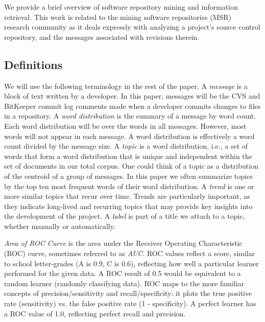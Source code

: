 \documentclass{acm_proc_article-sp}
\begin{document}
We provide a brief overview of software repository mining and information retrieval.
This work is related to the mining software repositories (MSR)~\cite{msr} research community as it deals expressly with analyzing a project's source control repository, and the messages associated with revisions therein.


\subsection{Definitions}
We will use the following terminology in the rest of the paper.
A \emph{message} is a block of text written by a developer. In this
paper, messages will be the CVS and BitKeeper commit log comments made
when a developer commits changes to files in a repository. A \emph{word
  distribution} is the summary of a message by word count. Each word
distribution will be over the words in all messages. However, most
words will not appear in each message. A word distribution is effectively
a word count divided by the message size. A \emph{topic} is a word
distribution, i.e., a set of words that form a word distribution that is
unique and independent within the set of documents in our total
corpus. One could think of a topic as a distribution of the centroid
of a group of messages. In this paper we often summarize topics by the
top ten most frequent words of their word distribution.  A \emph{trend}
is one or more similar topics that recur over time.  Trends are
particularly important, as they indicate long-lived and recurring
topics that may provide key insights into the development of the
project. A \emph{label} is part of a title we attach to a topic, whether manually or automatically.

\emph{Area of ROC Curve} is the area under the Receiver Operating Characteristic (ROC) curve, sometimes referred to as \emph{AUC}. ROC values reflect a score, similar to school letter-grades (A is 0.9, C is 0.6), reflecting how well a particular learner performed for the given data. A ROC result of 0.5 would be equivalent to a random learner (randomly classifying data). ROC maps to the more familiar concepts of precision/sensitivity and recall/specificity: it plots the true positive rate (sensitivity) vs. the false positive rate (1 - specificity). A perfect learner has a ROC value of 1.0, reflecting perfect recall and precision.
\end{document}
